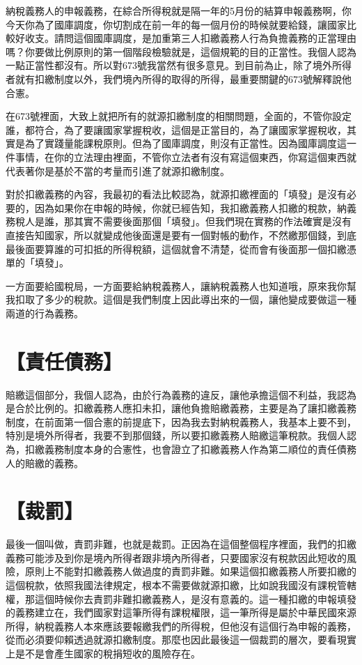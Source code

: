 \documentclass[]{ctexbook}
\begin{document}
納稅義務人的申報義務，在綜合所得稅就是隔一年的5月份的結算申報義務啊，你今天你為了國庫調度，你切割成在前一年的每一個月份的時候就要給錢，讓國家比較好收支。請問這個國庫調度，是加重第三人扣繳義務人行為負擔義務的正當理由嗎？你要做比例原則的第一個階段檢驗就是，這個規範的目的正當性。我個人認為一點正當性都沒有。所以對673號我當然有很多意見。到目前為止，除了境外所得者就有扣繳制度以外，我們境內所得的取得的所得，最重要關鍵的673號解釋說他合憲。

在673號裡面，大致上就把所有的就源扣繳制度的相關問題，全面的，不管你設定誰，都符合，為了要讓國家掌握稅收，這個是正當目的，為了讓國家掌握稅收，其實是為了實踐量能課稅原則。但為了國庫調度，則沒有正當性。因為國庫調度這一件事情，在你的立法理由裡面，不管你立法者有沒有寫這個東西，你寫這個東西就代表著你是基於不當的考量而引進了就源扣繳制度。

對於扣繳義務的內容，我最初的看法比較認為，就源扣繳裡面的「填發」是沒有必要的，因為如果你在申報的時候，你就已經告知，我扣繳義務人扣繳的稅款，納義務稅人是誰，那其實不需要後面那個「填發」。但我們現在實務的作法確實是沒有直接告知國家，所以就變成他後面還是要有一個對帳的動作，不然繳那個錢，到底最後面要算誰的可扣抵的所得稅額，這個就會不清楚，從而會有後面那一個扣繳憑單的「填發」。

一方面要給國稅局，一方面要給納稅義務人，讓納稅義務人也知道哦，原來我你幫我扣取了多少的稅款。這個是我們制度上因此導出來的一個，讓他變成要做這一種兩道的行為義務。

\hypertarget{ux8cacux4efbux50b5ux52d9}{%
\section{【責任債務】}\label{ux8cacux4efbux50b5ux52d9}}

賠繳這個部分，我個人認為，由於行為義務的違反，讓他承擔這個不利益，我認為是合於比例的。扣繳義務人應扣未扣，讓他負擔賠繳義務，主要是為了讓扣繳義務制度，在前面第一個合憲的前提底下，因為我去對納稅義務人，我基本上要不到，特別是境外所得者，我要不到那個錢，所以要扣繳義務人賠繳這筆稅款。我個人認為，扣繳義務制度本身的合憲性，也會證立了扣繳義務人作為第二順位的責任債務人的賠繳的義務。

\hypertarget{ux88c1ux7f70}{%
\section{【裁罰】}\label{ux88c1ux7f70}}

最後一個叫做，責罰非難，也就是裁罰。正因為在這個整個程序裡面，我們的扣繳義務可能涉及到你是境內所得者跟非境內所得者，只要國家沒有稅款因此短收的風險，原則上不能對扣繳義務人做過度的責罰非難。如果這個扣繳義務人所要扣繳的這個稅款，依照我國法律規定，根本不需要做就源扣繳，比如說我國沒有課稅管轄權，那這個時候你去責罰非難扣繳義務人，是沒有意義的。這一種扣繳的申報填發的義務建立在，我們國家對這筆所得有課稅權限，這一筆所得是屬於中華民國來源所得，納稅義務人本來應該要報繳我們的所得稅，但他沒有這個行為申報的義務，從而必須要仰賴透過就源扣繳制度。那麼也因此最後這一個裁罰的層次，要看現實上是不是會產生國家的稅捐短收的風險存在。
\end{document}

